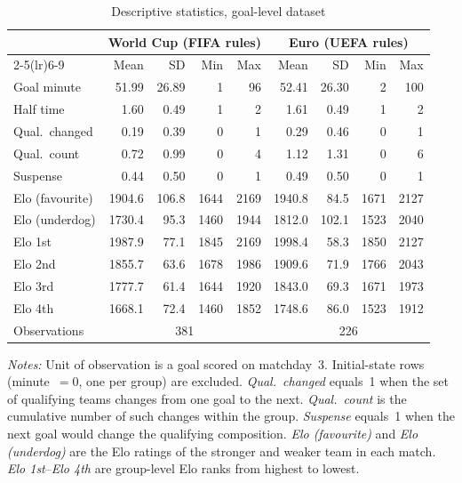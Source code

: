\begin{table}[H]
\centering
\caption{Descriptive statistics, goal-level dataset}
\label{tab:desc_stats_goals}
\begin{threeparttable}
\begin{tabular}{lrrrrrrrr}
\toprule
 & \multicolumn{4}{c}{World Cup (FIFA rules)} & \multicolumn{4}{c}{Euro (UEFA rules)} \\
\cmidrule(lr){2-5}\cmidrule(lr){6-9}
 & Mean & SD & Min & Max & Mean & SD & Min & Max \\
\midrule
Goal minute        & 51.99 & 26.89 &  1 &  96 & 52.41 & 26.30 &  2 & 100 \\
Half time          &  1.60 &  0.49 &  1 &   2 &  1.61 &  0.49 &  1 &   2 \\
Qual.\ changed     &  0.19 &  0.39 &  0 &   1 &  0.29 &  0.46 &  0 &   1 \\
Qual.\ count       &  0.72 &  0.99 &  0 &   4 &  1.12 &  1.31 &  0 &   6 \\
Suspense           &  0.44 &  0.50 &  0 &   1 &  0.49 &  0.50 &  0 &   1 \\
Elo (favourite)    & 1904.6 & 106.8 & 1644 & 2169 & 1940.8 &  84.5 & 1671 & 2127 \\
Elo (underdog)     & 1730.4 &  95.3 & 1460 & 1944 & 1812.0 & 102.1 & 1523 & 2040 \\
Elo 1st            & 1987.9 &  77.1 & 1845 & 2169 & 1998.4 &  58.3 & 1850 & 2127 \\
Elo 2nd            & 1855.7 &  63.6 & 1678 & 1986 & 1909.6 &  71.9 & 1766 & 2043 \\
Elo 3rd            & 1777.7 &  61.4 & 1644 & 1920 & 1843.0 &  69.3 & 1671 & 1973 \\
Elo 4th            & 1668.1 &  72.4 & 1460 & 1852 & 1748.6 &  86.0 & 1523 & 1912 \\
\midrule
Observations       & \multicolumn{4}{c}{381} & \multicolumn{4}{c}{226} \\
\bottomrule
\end{tabular}
\begin{tablenotes}
\small
\item \textit{Notes:} Unit of observation is a goal scored on matchday~3. Initial-state rows (minute~$= 0$, one per group) are excluded. \textit{Qual.\ changed} equals~1 when the set of qualifying teams changes from one goal to the next. \textit{Qual.\ count} is the cumulative number of such changes within the group. \textit{Suspense} equals~1 when the next goal would change the qualifying composition. \textit{Elo (favourite)} and \textit{Elo (underdog)} are the Elo ratings of the stronger and weaker team in each match. \textit{Elo 1st}--\textit{Elo 4th} are group-level Elo ranks from highest to lowest.
\end{tablenotes}
\end{threeparttable}
\end{table}
